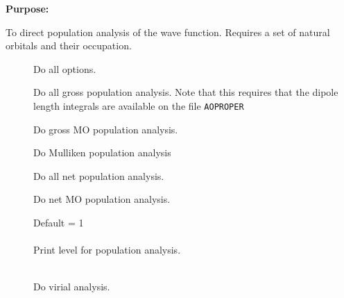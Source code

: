 {\bf Purpose:}

To direct population analysis of the wave function.
Requires a set of natural orbitals and their occupation.

\begin{description}
\item[]
  Do all options.


\item[]
  Do all gross population analysis. Note that this requires that the dipole
  length integrals are available on the file \verb|AOPROPER|

\item[]
  Do gross MO population analysis.

\item[]
  Do Mulliken population analysis

\item[]
  Do all net population analysis.

\item[]
  Do net MO population analysis.

\item[]
  Default = 1\\
   \\
  Print level for population analysis.


\item[] \ \\
  Do virial analysis.
\end{description}

\pagebreak[3]
\subsection{\label{ref-priinp}}

